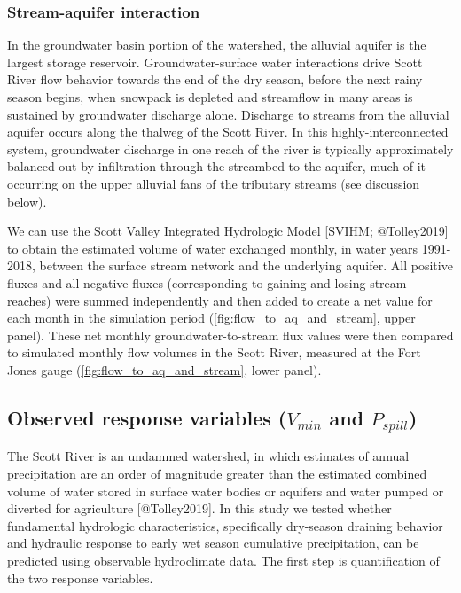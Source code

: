 \documentclass[
]{article}
\begin{document}
\hypertarget{stream-aquifer-interaction}{%
\subsubsection{Stream-aquifer
interaction}\label{stream-aquifer-interaction}}

In the groundwater basin portion of the watershed, the alluvial aquifer
is the largest storage reservoir. Groundwater-surface water interactions
drive Scott River flow behavior towards the end of the dry season,
before the next rainy season begins, when snowpack is depleted and
streamflow in many areas is sustained by groundwater discharge alone.
Discharge to streams from the alluvial aquifer occurs along the thalweg
of the Scott River. In this highly-interconnected system, groundwater
discharge in one reach of the river is typically approximately balanced
out by infiltration through the streambed to the aquifer, much of it
occurring on the upper alluvial fans of the tributary streams (see
discussion below).

We can use the Scott Valley Integrated Hydrologic Model {[}SVIHM;
@Tolley2019{]} to obtain the estimated volume of water exchanged
monthly, in water years 1991-2018, between the surface stream network
and the underlying aquifer. All positive fluxes and all negative fluxes
(corresponding to gaining and losing stream reaches) were summed
independently and then added to create a net value for each month in the
simulation period (\autoref{fig:flow_to_aq_and_stream}, upper panel).
These net monthly groundwater-to-stream flux values were then compared
to simulated monthly flow volumes in the Scott River, measured at the
Fort Jones gauge (\autoref{fig:flow_to_aq_and_stream}, lower panel).

\hypertarget{observed-response-variables-v_min-and-p_spill}{%
\subsection{\texorpdfstring{Observed response variables (\(V_{min}\) and
\(P_{spill}\))}{Observed response variables (V\_\{min\} and P\_\{spill\})}}\label{observed-response-variables-v_min-and-p_spill}}

The Scott River is an undammed watershed, in which estimates of annual
precipitation are an order of magnitude greater than the estimated
combined volume of water stored in surface water bodies or aquifers and
water pumped or diverted for agriculture {[}@Tolley2019{]}. In this
study we tested whether fundamental hydrologic characteristics,
specifically dry-season draining behavior and hydraulic response to
early wet season cumulative precipitation, can be predicted using
observable hydroclimate data. The first step is quantification of the
two response variables.
\end{document}

